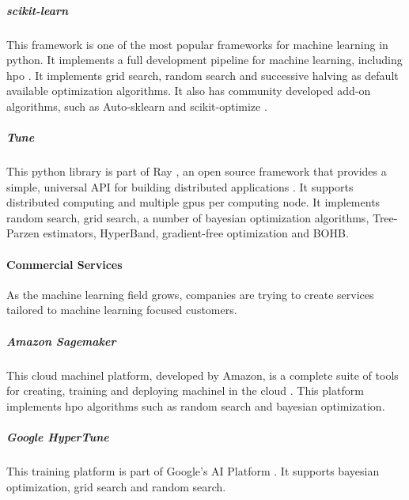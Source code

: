 \subparagraph{scikit-learn} This framework is one of the most popular frameworks for machine learning in \acrshort{python}. It implements a full development pipeline for machine learning, including \acrshort{hpo} \parencite{scikit-learn}. It implements grid search, random search and successive halving as default available optimization algorithms. It also has community developed add-on algorithms, such as Auto-sklearn \parencite{auto-sklearn} and scikit-optimize \parencite{scikit-optimize}.

\subparagraph{Tune} This \acrshort{python} library is part of Ray \parencite{ray}, an open source framework that provides a simple, universal API for building distributed applications \parencite{liaw2018tune}. It supports distributed computing and multiple \acrshort{gpu}s per computing node. It implements random search, grid search, a number of bayesian optimization algorithms, Tree-Parzen estimators, HyperBand, gradient-free optimization and BOHB.

\paragraph{Commercial Services} 

As the machine learning field grows, companies are trying to create services tailored to machine learning focused customers.

\subparagraph{Amazon Sagemaker} This cloud \acrshort{machinel} platform, developed by Amazon, is a complete suite of tools for creating, training and deploying \acrshort{machinel} in the cloud \parencite{sagemaker}. This platform implements \acrshort{hpo} algorithms such as random search and bayesian optimization.

\subparagraph{Google HyperTune} This training platform is part of Google's AI Platform \parencite{ghypertune}. It supports bayesian optimization, grid search and random search.   


